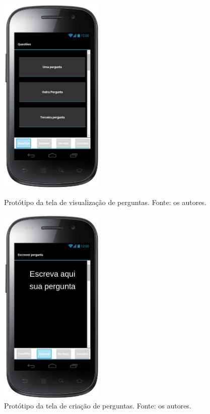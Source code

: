 \begin{figure}
\centering
\begin{minipage}{0.45\textwidth}
\centering
\includegraphics[width=5cm]{protperguntas.png}
\caption{Protótipo da tela de visualização de perguntas. Fonte: os autores.}
\label{fig:prot_perguntas}
\end{minipage}\hfill
\begin{minipage}{0.45\textwidth}
\centering
\includegraphics[width=5cm]{protescreverpergunta.png}
\caption{Protótipo da tela de criação de perguntas. Fonte: os autores.}
\label{fig:prot_escreverPergunta}
\end{minipage}
\end{figure}


